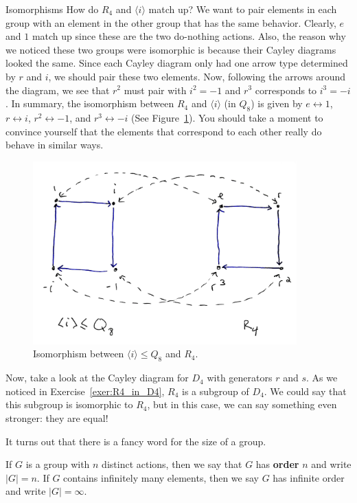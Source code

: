 \begin{section}{Isomorphisms}
How do $R_4$ and $\langle i\rangle$ match up?  We want to pair elements in each group with an element in the other group that has the same behavior.  Clearly, $e$ and $1$ match up since these are the two do-nothing actions.  Also, the reason why we noticed these two groups were isomorphic is because their Cayley diagrams looked the same.  Since each Cayley diagram only had one arrow type determined by $r$ and $i$, we should pair these two elements.  Now, following the arrows around the diagram, we see that $r^2$ must pair with $i^2=-1$ and $r^3$ corresponds to $i^3=-i$.  In summary, the isomorphism between $R_4$ and $\langle i\rangle$ (in $Q_8$) is given by $e\leftrightarrow 1$, $r\leftrightarrow i$, $r^2\leftrightarrow -1$, and $r^3\leftrightarrow -i$ (See Figure~\ref{fig:isoR4}).  You should take a moment to convince yourself that the elements that correspond to each other really do behave in similar ways.

\begin{figure}\label{fig:isoR4}
\begin{center}
\includegraphics[width=4in]{isoR4.png}
\end{center}
\caption{Isomorphism between $\langle i\rangle\leq Q_8$ and $R_4$.}
\end{figure}

Now, take a look at the Cayley diagram for $D_4$ with generators $r$ and $s$.  As we noticed in Exercise~\ref{exer:R4_in_D4}, $R_4$ is a subgroup of $D_4$.  We could say that this subgroup is isomorphic to $R_4$, but in this case, we can say something even stronger: they are equal!

It turns out that there is a fancy word for the size of a group.

\begin{definition}
If $G$ is a group with $n$ distinct actions, then we say that $G$ has \textbf{order} $n$ and write $|G|=n$.  If $G$ contains infinitely many elements, then we say $G$ has infinite order and write $|G|=\infty$.
\end{definition}


\end{section}
